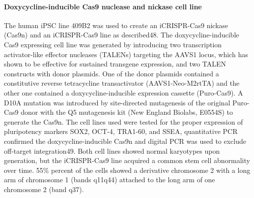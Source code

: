 \paragraph{Doxycycline-inducible Cas9 nuclease and nickase cell line}
The human iPSC line 409B2 was used to create an iCRISPR-Cas9 nickase (Cas9n) and an iCRISPR-Cas9 line as described48. The doxycycline-inducible Cas9 expressing cell line was generated by introducing two transcription activator-like effector nucleases (TALENs) targeting the AAVS1 locus, which has shown to be effective for sustained transgene expression, and two TALEN constructs with donor plasmids. One of the donor plasmids contained a constitutive reverse tetracycline transactivator (AAVS1-Neo-M2rtTA) and the other one contained a doxycycline-inducible expression cassette (Puro-Cas9). A D10A mutation was introduced by site-directed mutagenesis of the original Puro-Cas9 donor with the Q5 mutagenesis kit (New England Biolabs, E0554S) to generate the Cas9n. The cell lines used were tested for the proper expression of pluripotency markers SOX2, OCT-4, TRA1-60, and SSEA, quantitative PCR confirmed the doxycycline-inducible Cas9n and digital PCR was used to exclude off-target integration49. Both cell lines showed normal karyotypes upon generation, but the iCRISPR-Cas9 line acquired a common stem cell abnormality over time. 55\% percent of the cells showed  a  derivative  chromosome  2  with  a  long  arm  of chromosome  1 (bands  q11q44)  attached  to  the  long  arm  of  one chromosome  2  (band  q37).
 
